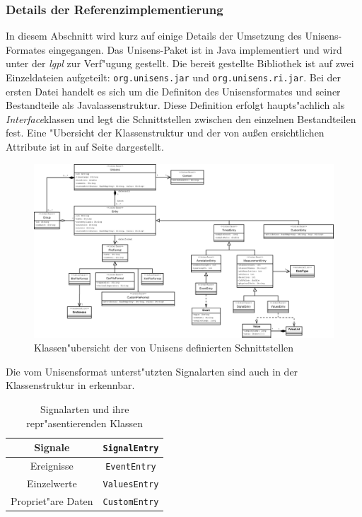 \subsubsection{Details der Referenzimplementierung}

In diesem Abschnitt wird kurz auf einige Details der Umsetzung des Unisens-Formates eingegangen.
Das Unisens-Paket ist in Java implementiert und wird unter der \emph{\ac{lgpl}} zur Verf"ugung gestellt.
Die bereit gestellte Bibliothek ist auf zwei Einzeldateien aufgeteilt: \verb|org.unisens.jar| und \verb|org.unisens.ri.jar|.
Bei der ersten Datei handelt es sich um die Definiton des Unisensformates und seiner Bestandteile als Javalassenstruktur.
Diese Definition erfolgt haupts"achlich als \emph{Interface}klassen und legt die Schnittstellen zwischen den einzelnen Bestandteilen fest.
Eine "Ubersicht der Klassenstruktur und der von au\ss en ersichtlichen Attribute ist in  auf Seite \pageref{pic:unisens_interface} dargestellt.
\begin{figure}
\includegraphics[width=\textwidth]{bilder/unisens_interface_.eps}
\caption{Klassen"ubersicht der von Unisens definierten Schnittstellen}
\label{pic:unisens_interface}
\end{figure}
Die vom Unisensformat unterst"utzten Signalarten sind auch in der Klassenstruktur in  erkennbar.
\begin{table}[h]
\centering
\begin{tabular}{|c|c|}
	\hline Signale & \verb|SignalEntry| \\
	\hline Ereignisse & \verb|EventEntry| \\
	\hline Einzelwerte & \verb|ValuesEntry| \\
	\hline Propriet"are Daten & \verb|CustomEntry| \\
	\hline
\end{tabular}
\caption{Signalarten und ihre repr"asentierenden Klassen}
\label{tab:unisens_signalklassen}
\end{table}

